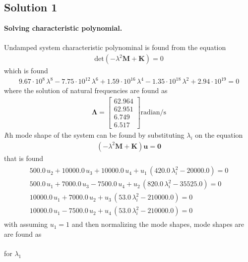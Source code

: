 \documentclass[]{report}
\begin{document}
\begin{center}
\subsection*{Solution 1}
\end{center}
\textbf{Solving characteristic polynomial.}\\~\\
Undamped system characteristic polynominal is found from the equation
\begin{align*}
\mathrm{det}\left(-\lambda^2\mathbf{M}+ \mathbf{K}\right)=0
\end{align*}
which is found 
\begin{align*}
9.67\cdot 10^8\, \lambda^8 - 7.75\cdot 10^{12}\, \lambda^6 + 1.59\cdot 10^{16}\, \lambda^4 - 1.35\cdot 10^{18}\, \lambda^2 + 2.94\cdot 10^{19}=0
\end{align*}
where the solution of natural frequencies are found as
\begin{align*}
{\mathbf{\Lambda}}=\left[\begin{array}{c} 62.964\\ 62.951\\ 6.749\\6.517 \end{array}\right]\mathrm{radian/s}
\end{align*}
\emph{I}th mode shape of the system can be found by substituting $\lambda_i$ on the equation 
\begin{align*}
\left(-\lambda^2\mathbf{M}+ \mathbf{K}\right)\mathbf{u}=\mathbf{0}
\end{align*}
that is found 
\begin{align*}
\begin{array}{ccc} 500.0\, u_{2} + 10000.0\, u_{3} + 10000.0\, u_{4} + u_{1}\, \left(420.0\, \lambda_i^2 - 20000.0\right)= 0\\ 500.0\, u_{1} + 7000.0\, u_{3} - 7500.0\, u_{4} + u_{2}\, \left(820.0\, \lambda_i^2 - 35525.0\right)= 0\\ 10000.0\, u_{1} + 7000.0\, u_{2} + u_{3}\, \left(53.0\, \lambda_i^2 - 210000.0\right)= 0\\ 10000.0\, u_{1} - 7500.0\, u_{2} + u_{4}\, \left(53.0\, \lambda_i^2 - 210000.0\right)= 0 \end{array}
\end{align*}
with assuming $u_1=1$ and then normalizing the mode shapes, mode shapes are are found as\\~\\
for $\lambda_1$
\end{document}
